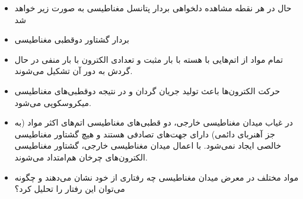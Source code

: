 \begin{ELexample}{}
\begin{ELsolution}
\begin{itemize}
\tightlist
\item
  حال در هر نقطه مشاهده دلخواهی بردار پتانسل مغناطیسی به صورت زیر خواهد شد
\end{itemize}


\begin{itemize}
\tightlist
\item
  بردار گشتاور دوقطبی مغناطیسی
\end{itemize}


\begin{ELimportant}{}


\end{ELimportant}


\begin{ELimportant}{}


\end{ELimportant}


\end{ELsolution}

\end{ELexample}

\ELhold


\begin{ELunit}


\begin{itemize}
\tightlist
\item
  تمام مواد از اتم‌هایی با هسته با بار مثبت و تعدادی الکترون با بار منفی در حال گردش به دور آن تشکیل می‌شوند.
\item
  حرکت الکترون‌ها باعث تولید جریان گردان و در نتیجه دوقطبی‌های مغناطیسی میکروسکوپی می‌شود.
\item
  در غیاب میدان مغناطیسی خارجی، دو قطبی‌های مغناطیسی اتم‌های اکثر مواد (به جز آهنربای دائمی) دارای جهت‌های تصادفی هستند و هیچ گشتاور مغناطیسی خالصی ایجاد نمی‌شود. با اعمال میدان مغناطیسی خارجی، گشتاور مغناطیسی الکترون‌های چرخان هم‌امتداد می‌شوند.
\item
  مواد مختلف در معرض میدان مغناطیسی چه رفتاری از خود نشان می‌دهند و چگونه می‌توان این رفتار را تحلیل کرد؟
\end{itemize}

\end{ELunit}

